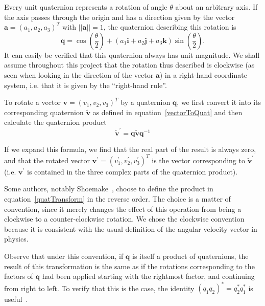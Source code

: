 Every unit quaternion represents a rotation of angle $\theta$ about an arbitrary axis.
If the axis passes through the origin and has a direction given by the vector
$\mathbf{a} = (a_1, a_2, a_3)^T$ with $||\mathbf{a}|| = 1$, the quaternion describing
this rotation is
\begin{equation}
\label{quatRotation}
\mathbf{q} = \cos\left(\frac{\theta}{2}\right) + (a_1\mathbf{i} + a_2\mathbf{j} +
    a_3\mathbf{k}) \sin\left(\frac{\theta}{2}\right).
\end{equation}
It can easily be verified that this quaternion always has unit magnitude.
We shall assume throughout this project that the rotation thus described is clockwise (as seen
when looking in the direction of the vector $\mathbf{a}$) in a right-hand coordinate system,
i.e. that it is given by the ``right-hand rule''.

To rotate a vector $\mathbf{v} = (v_1, v_2, v_3)^T$ by a quaternion $\mathbf{q}$, we first
convert it into its corresponding quaternion $\tilde{\mathbf{v}}$ as defined in
equation~\ref{vectorToQuat} and then calculate the quaternion product
\begin{equation}
\label{quatTransform}
\tilde{\mathbf{v}}^\prime = \mathbf{q}\tilde{\mathbf{v}}\mathbf{q}^{-1}
\end{equation}

If we expand this formula, we find that the real part of the result is always zero, and
that the rotated vector $\mathbf{v}^\prime = (v_1^\prime, v_2^\prime, v_3^\prime)^T$ is
the vector corresponding to $\tilde{\mathbf{v}}^\prime$ (i.e. $\mathbf{v}^\prime$ is
contained in the three complex parts of the quaternion product).

Some authors, notably Shoemake~\cite{Shoemake:85}, choose to define the product in
equation~\ref{quatTransform} in
the reverse order. The choice is a matter of convention, since it merely changes the effect
of this operation from being a clockwise to a counter-clockwise rotation. We chose the clockwise
convention because it is consistent with the usual definition of the angular velocity vector
in physics.

Observe that under this convention, if $\mathbf{q}$ is itself a product of quaternions, the
result of this transformation is the same as if the rotations corresponding to the factors
of $\mathbf{q}$ had been applied starting with the rightmost factor, and continuing from
right to left. To verify that this is the case, the identity
$(q_1 q_2)^* = q_2^* q_1^*$ is useful~\cite{MathWorld:Quaternion}.

